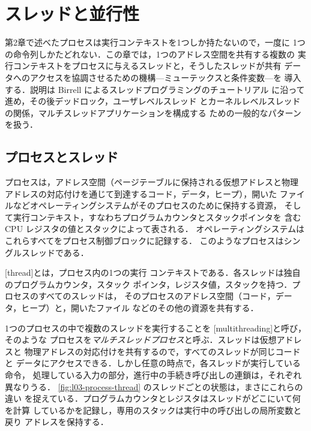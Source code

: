 \documentclass[../main.tex]{subfiles}
\begin{document}
\chapter{スレッドと並行性}

第2章で述べたプロセスは実行コンテキストを1つしか持たないので，一度に
1つの命令列しかたどれない．この章では，1つのアドレス空間を共有する複数の
実行コンテキストをプロセスに与えるスレッドと，そうしたスレッドが共有
データへのアクセスを協調させるための機構---ミューテックスと条件変数---を
導入する．説明は Birrell によるスレッドプログラミングのチュートリアル
\cite{birrell1989} に沿って進め，その後デッドロック，ユーザレベルスレッド
とカーネルレベルスレッドの関係，マルチスレッドアプリケーションを構成する
ための一般的なパターンを扱う．

\section{プロセスとスレッド}
\label{sec:l03-threads}

プロセスは，アドレス空間（ページテーブルに保持される仮想アドレスと物理
アドレスの対応付けを通じて到達するコード，データ，ヒープ），開いた
ファイルなどオペレーティングシステムがそのプロセスのために保持する資源，
そして実行コンテキスト，すなわちプログラムカウンタとスタックポインタを
含む CPU レジスタの値とスタックによって表される．%
オペレーティングシステムはこれらすべてをプロセス制御ブロックに記録する．
このようなプロセスはシングルスレッドである．

\begin{definition}[スレッド]
  [thread]とは，プロセス内の1つの実行
  コンテキストである．各スレッドは独自のプログラムカウンタ，スタック
  ポインタ，レジスタ値，スタックを持つ．プロセスのすべてのスレッドは，
  そのプロセスのアドレス空間（コード，データ，ヒープ）と，開いたファイル
  などのその他の資源を共有する．
\end{definition}

1つのプロセスの中で複数のスレッドを実行することを
[multithreading]と呼び，そのような
プロセスを\emph{マルチスレッドプロセス}と呼ぶ．スレッドは仮想アドレスと
物理アドレスの対応付けを共有するので，すべてのスレッドが同じコードと
データにアクセスできる．しかし任意の時点で，各スレッドが実行している命令，
処理している入力の部分，進行中の手続き呼び出しの連鎖は，それぞれ異なりうる．
\cref{fig:l03-process-thread} のスレッドごとの状態は，まさにこれらの違い
を捉えている．プログラムカウンタとレジスタはスレッドがどこにいて何を計算
しているかを記録し，専用のスタックは実行中の呼び出しの局所変数と戻り
アドレスを保持する．
\end{document}
